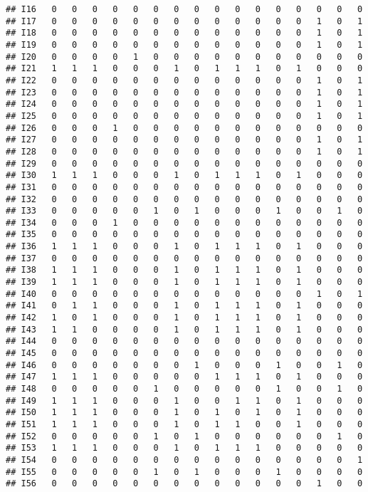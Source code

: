 \documentclass[
]{article}
\begin{document}
\begin{verbatim}
## I16   0   0   0   0   0   0   0   0   0   0   0   0   0   0   0   0
## I17   0   0   0   0   0   0   0   0   0   0   0   0   0   1   0   1
## I18   0   0   0   0   0   0   0   0   0   0   0   0   0   1   0   1
## I19   0   0   0   0   0   0   0   0   0   0   0   0   0   1   0   1
## I20   0   0   0   0   1   0   0   0   0   0   0   0   0   0   0   0
## I21   1   1   1   0   0   0   1   0   1   1   1   0   1   0   0   0
## I22   0   0   0   0   0   0   0   0   0   0   0   0   0   1   0   1
## I23   0   0   0   0   0   0   0   0   0   0   0   0   0   1   0   1
## I24   0   0   0   0   0   0   0   0   0   0   0   0   0   1   0   1
## I25   0   0   0   0   0   0   0   0   0   0   0   0   0   1   0   1
## I26   0   0   0   1   0   0   0   0   0   0   0   0   0   0   0   0
## I27   0   0   0   0   0   0   0   0   0   0   0   0   0   1   0   1
## I28   0   0   0   0   0   0   0   0   0   0   0   0   0   1   0   1
## I29   0   0   0   0   0   0   0   0   0   0   0   0   0   0   0   0
## I30   1   1   1   0   0   0   1   0   1   1   1   0   1   0   0   0
## I31   0   0   0   0   0   0   0   0   0   0   0   0   0   0   0   0
## I32   0   0   0   0   0   0   0   0   0   0   0   0   0   0   0   0
## I33   0   0   0   0   0   1   0   1   0   0   0   1   0   0   1   0
## I34   0   0   0   1   0   0   0   0   0   0   0   0   0   0   0   0
## I35   0   0   0   0   0   0   0   0   0   0   0   0   0   0   0   0
## I36   1   1   1   0   0   0   1   0   1   1   1   0   1   0   0   0
## I37   0   0   0   0   0   0   0   0   0   0   0   0   0   0   0   0
## I38   1   1   1   0   0   0   1   0   1   1   1   0   1   0   0   0
## I39   1   1   1   0   0   0   1   0   1   1   1   0   1   0   0   0
## I40   0   0   0   0   0   0   0   0   0   0   0   0   0   1   0   1
## I41   0   1   1   0   0   0   1   0   1   1   1   0   1   0   0   0
## I42   1   0   1   0   0   0   1   0   1   1   1   0   1   0   0   0
## I43   1   1   0   0   0   0   1   0   1   1   1   0   1   0   0   0
## I44   0   0   0   0   0   0   0   0   0   0   0   0   0   0   0   0
## I45   0   0   0   0   0   0   0   0   0   0   0   0   0   0   0   0
## I46   0   0   0   0   0   0   0   1   0   0   0   1   0   0   1   0
## I47   1   1   1   0   0   0   0   0   1   1   1   0   1   0   0   0
## I48   0   0   0   0   0   1   0   0   0   0   0   1   0   0   1   0
## I49   1   1   1   0   0   0   1   0   0   1   1   0   1   0   0   0
## I50   1   1   1   0   0   0   1   0   1   0   1   0   1   0   0   0
## I51   1   1   1   0   0   0   1   0   1   1   0   0   1   0   0   0
## I52   0   0   0   0   0   1   0   1   0   0   0   0   0   0   1   0
## I53   1   1   1   0   0   0   1   0   1   1   1   0   0   0   0   0
## I54   0   0   0   0   0   0   0   0   0   0   0   0   0   0   0   1
## I55   0   0   0   0   0   1   0   1   0   0   0   1   0   0   0   0
## I56   0   0   0   0   0   0   0   0   0   0   0   0   0   1   0   0
\end{verbatim}
\end{document}
